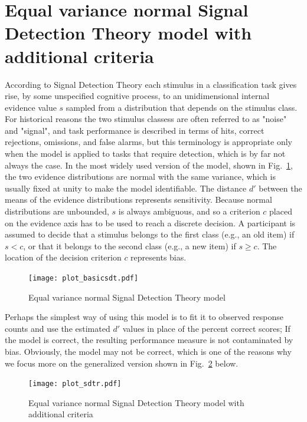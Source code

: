 \documentclass[oneside,a4paper]{article}
\begin{document}
\section{Equal variance normal Signal Detection Theory model with
  additional criteria}

According to Signal Detection Theory each stimulus in a classification
task gives rise, by some unspecified cognitive process, to an
unidimensional internal evidence value $s$ sampled from
a distribution that depends on the stimulus class. For historical
reasons the two stimulus classess are often referred to as "noise" and
"signal", and task performance is described in terms of hits, correct
rejections, omissions, and false alarms, but this terminology is
appropriate only when the model is applied to tasks that require
detection, which is by far not always the case. In the most widely
used version of the model, shown in Fig.~\ref{basicsdt}, the two
evidence distributions are normal with the same variance, which is
usually fixed at unity to make the model identifiable. The distance
$d'$ between the means of the
evidence distributions represents sensitivity. Because normal
distributions are unbounded, $s$ is always ambiguous, and so a
criterion $c$ placed on the evidence axis has to be used to reach a
discrete
decision. A participant is assumed to decide that a stimulus belongs
to the first class (e.g., an old item) if $s < c$, or that it belongs
to the second class (e.g., a new item) if $s \geq c$. The location of
the decision criterion $c$ represents bias.


\begin{figure}[H]
  \centering
  \texttt{[image: plot\_basicsdt.pdf]}
  \caption{Equal variance normal Signal Detection Theory model}
  \label{basicsdt}
\end{figure}


Perhaps the simplest way of using this model is to fit it to observed
response counts and use the estimated $d'$ values in place of the
percent correct scores; If the model is correct, the resulting
performance measure is not contaminated by bias. Obviously, the model
may not be correct, which is one of the reasons why we focus more on
the generalized version shown in Fig.~\ref{sdtr} below.


\begin{figure}[H]
  \centering
  \texttt{[image: plot\_sdtr.pdf]}
  \caption{Equal variance normal Signal Detection Theory model with
    additional criteria}
  \label{sdtr}
\end{figure}
\end{document}
